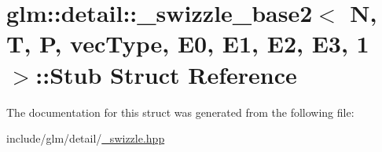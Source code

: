 \hypertarget{structglm_1_1detail_1_1__swizzle__base2_3_01N_00_01T_00_01P_00_01vecType_00_01E0_00_01E1_00_01E2_00_01E3_00_011_01_4_1_1Stub}{}\section{glm\+:\+:detail\+:\+:\+\_\+swizzle\+\_\+base2$<$ N, T, P, vec\+Type, E0, E1, E2, E3, 1 $>$\+:\+:Stub Struct Reference}
\label{structglm_1_1detail_1_1__swizzle__base2_3_01N_00_01T_00_01P_00_01vecType_00_01E0_00_01E1_00_01E2_00_01E3_00_011_01_4_1_1Stub}


The documentation for this struct was generated from the following file\+:\begin{DoxyCompactItemize}
\item 
include/glm/detail/\hyperlink{__swizzle_8hpp}{\+\_\+swizzle.\+hpp}\end{DoxyCompactItemize}
